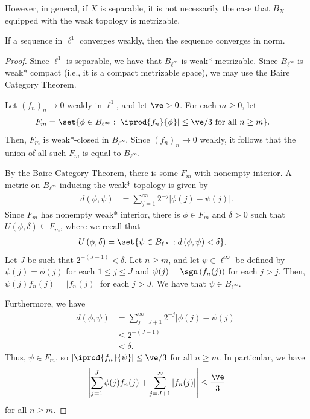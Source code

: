 \documentclass[10pt]{mypackage}
\begin{document}
However, in general, if $X$ is separable, it is not necessarily the case that $B_X$ equipped with the weak topology is metrizable.
\begin{theorem}
  If a sequence in $\ell^1$ converges weakly, then the sequence converges in norm.
\end{theorem}
\begin{proof}
  Since $\ell^1$ is separable, we have that $B_{\ell^{\infty}}$ is weak* metrizable. Since $B_{\ell^{\infty}}$ is weak* compact (i.e., it is a compact metrizable space), we may use the Baire Category Theorem.

  Let $\left( f_n \right)_n\rightarrow 0$ weakly in $\ell^1$, and let $\ve > 0$. For each $m\geq 0$, let
  \begin{align*}
    F_m &= \set{\phi\in B_{\ell^{\infty}} : \left\vert \iprod{f_n}{\phi} \right\vert \leq \ve/3\text{ for all }n\geq m}.
  \end{align*}
  Then, $F_m$ is weak*-closed in $B_{\ell^{\infty}}$. Since $\left( f_n \right)_n\rightarrow 0$ weakly, it follows that the union of all such $F_m$ is equal to $B_{\ell^{\infty}}$.

  By the Baire Category Theorem, there is some $F_m$ with nonempty interior. A metric on $B_{\ell^{\infty}}$ inducing the weak* topology is given by
  \begin{align*}
    d\left( \phi,\psi \right) &= \sum_{j=1}^{\infty} 2^{-j} \left\vert \phi(j)-\psi(j) \right\vert.
  \end{align*}
  Since $F_m$ has nonempty weak* interior, there is $\phi\in F_m$ and $\delta > 0$ such that $U\left( \phi,\delta \right)\subseteq F_m$, where we recall that
  \begin{align*}
    U\left( \phi,\delta \right) &= \set{\psi\in B_{\ell^{\infty}} : d\left( \phi,\psi \right) < \delta}.
  \end{align*}
  Let $J$ be such that $2^{-(J-1)} < \delta$. Let $n\geq m$, and let $\psi\in \ell^{\infty}$ be defined by $\psi(j) = \phi(j)$ for each $1\leq j \leq J$ and $\psi(j) = \sgn\left( f_n(j) \right)$ for each $j > j$. Then, $\psi(j)f_n(j) = \left\vert f_n(j) \right\vert$ for each $j > J$. We have that $\psi\in B_{\ell^{\infty}}$.

  Furthermore, we have
  \begin{align*}
    d\left( \phi,\psi \right) &= \sum_{j=J+1}^{\infty}2^{-j} \left\vert \phi(j)-\psi(j) \right\vert\\
                              &\leq 2^{-\left( J-1 \right)}\\
                              &< \delta.
  \end{align*}
  Thus, $\psi\in F_m$, so $\left\vert \iprod{f_n}{\psi} \right\vert \leq \ve/3$ for all $n\geq m$. In particular, we have
  \begin{align*}
    \left\vert \sum_{j=1}^{J}\phi(j)f_n(j) + \sum_{j=J+1}^{\infty}\left\vert f_n(j) \right\vert \right\vert \leq \frac{\ve}{3}
  \end{align*}
  for all $n\geq m$.


\end{proof}
\end{document}
